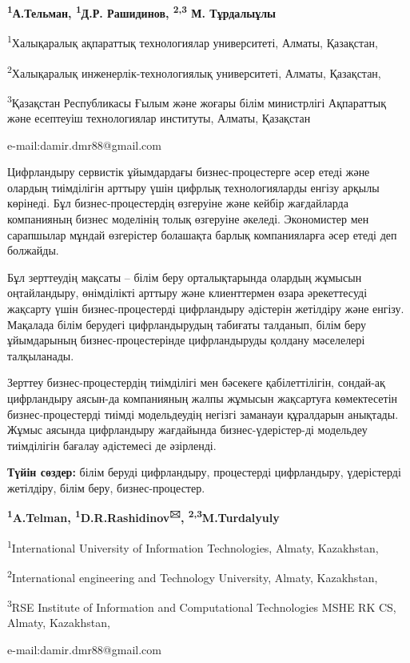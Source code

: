 \begin{center}

{\bfseries \textsuperscript{1}А.Тельман, \textsuperscript{1}Д.Р. Рашидинов\envelope, \textsuperscript{2,3} М. Тұрдалыұлы}

\textsuperscript{1}Халықаралық ақпараттық технологиялар университеті, Алматы, Қазақстан,

\textsuperscript{2}Халықаралық инженерлік-технологиялық университеті, Алматы, Қазақстан,

\textsuperscript{3}Қазақстан Республикасы Ғылым және жоғары білім министрлігі Ақпараттық
және есептеуіш технологиялар институты, Алматы, Қазақстан

e-mail:damir.dmr88@gmail.com
\end{center}

Цифрландыру сервистік ұйымдардағы бизнес-процестерге әсер етеді және
олардың тиімділігін арттыру үшін цифрлық технологияларды енгізу арқылы
көрінеді. Бұл бизнес-процестердің өзгеруіне және кейбір жағдайларда
компанияның бизнес моделінің толық өзгеруіне әкеледі. Экономистер мен
сарапшылар мұндай өзгерістер болашақта барлық компанияларға әсер етеді
деп болжайды.

Бұл зерттеудің мақсаты -- білім беру орталықтарында олардың жұмысын
оңтайландыру, өнімділікті арттыру және клиенттермен өзара әрекеттесуді
жақсарту үшін бизнес-процестерді цифрландыру әдістерін жетілдіру және
енгізу. Мақалада білім берудегі цифрландырудың табиғаты талданып, білім
беру ұйымдарының бизнес-процестерінде цифрландыруды қолдану мәселелері
талқыланады.

Зерттеу бизнес-процестердің тиімділігі мен бәсекеге қабілеттілігін,
сондай-ақ цифрландыру аясын-да компанияның жалпы жұмысын жақсартуға
көмектесетін бизнес-процестерді тиімді модельдеудің негізгі заманауи
құралдарын анықтады. Жұмыс аясында цифрландыру жағдайында
бизнес-үдерістер-ді модельдеу тиімділігін бағалау әдістемесі де
әзірленді.

{\bfseries Түйін сөздер:} білім беруді цифрландыру, процестерді
цифрландыру, үдерістерді жетілдіру, білім беру, бизнес-процестер.

\begin{center}

{\bfseries \textsuperscript{1}A.Telman, \textsuperscript{1}D.R.Rashidinov\textsuperscript{🖂}, \textsuperscript{2,3}M.Turdalyuly}

\textsuperscript{1}International University of Information Technologies, Almaty, Kazakhstan,

\textsuperscript{2}International engineering and Technology University, Almaty, Kazakhstan,

\textsuperscript{3}RSE Institute of Information and Computational Technologies MSHE RK CS, Almaty, Kazakhstan,

e-mail:damir.dmr88@gmail.com
\end{center}

